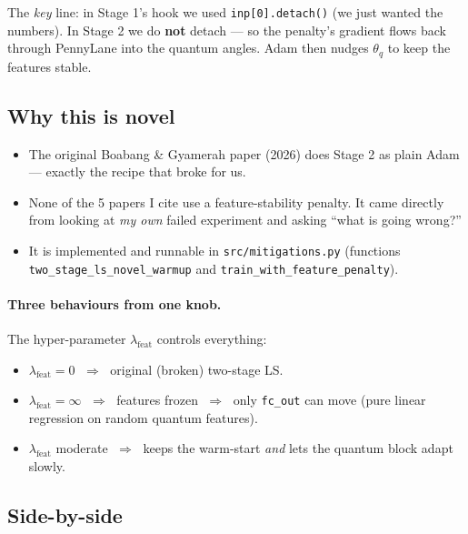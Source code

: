 \documentclass[11pt,a4paper]{article}
\begin{document}
The \emph{key} line: in Stage 1's hook we used \texttt{inp[0].detach()} (we just wanted the numbers). In Stage 2 we do \textbf{not} detach --- so the penalty's gradient flows back through PennyLane into the quantum angles. Adam then nudges $\theta_q$ to keep the features stable.

\subsection{Why this is novel}

\begin{itemize}
  \item The original Boabang \& Gyamerah paper (2026) does Stage 2 as plain Adam --- exactly the recipe that broke for us.
  \item None of the 5 papers I cite use a feature-stability penalty. It came directly from looking at \emph{my own} failed experiment and asking ``what is going wrong?''
  \item It is implemented and runnable in \texttt{src/mitigations.py} (functions \texttt{two\_stage\_ls\_novel\_warmup} and \texttt{train\_with\_feature\_penalty}).
\end{itemize}

\paragraph{Three behaviours from one knob.} The hyper-parameter $\lambda_{\text{feat}}$ controls everything:
\begin{itemize}
  \item $\lambda_{\text{feat}} = 0$ $\;\Rightarrow\;$ original (broken) two-stage LS.
  \item $\lambda_{\text{feat}} = \infty$ $\;\Rightarrow\;$ features frozen $\;\Rightarrow\;$ only \texttt{fc\_out} can move (pure linear regression on random quantum features).
  \item $\lambda_{\text{feat}}$ moderate $\;\Rightarrow\;$ keeps the warm-start \emph{and} lets the quantum block adapt slowly.
\end{itemize}

\subsection{Side-by-side}
\end{document}
